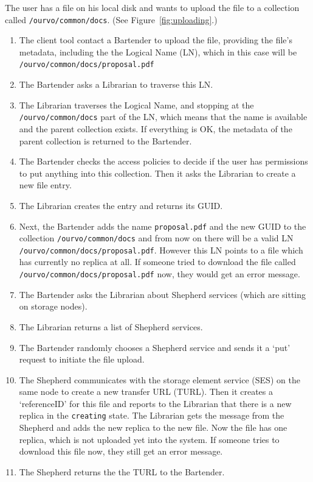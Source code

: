 \documentclass{book}
\begin{document}
The user has a file on his local disk and wants to upload the file to a collection called \verb#/ourvo/common/docs#. (See Figure~\ref{fig:uploading}.)
\begin{enumerate}
    \item The client tool contact a Bartender to upload the file, providing the file's metadata, including the the Logical Name (LN), which in this case will be \verb#/ourvo/common/docs/proposal.pdf#
    \item The Bartender asks a Librarian to traverse this LN.
    \item The Librarian traverses the Logical Name, and stopping at the \verb#/ourvo/common/docs# part of the LN, which means that the name is available and the parent collection exists. If everything is OK, the metadata of the parent collection is returned to the Bartender. 
    \item The Bartender checks the access policies to decide if the user has permissions to put anything into this collection. Then it asks the Librarian to create a new file entry. 
    \item The Librarian creates the entry and returns its GUID.
    \item Next, the Bartender adds the name \verb#proposal.pdf# and the new GUID to the collection \verb#/ourvo/common/docs# and from now on there will be a valid LN \verb#/ourvo/common/docs/proposal.pdf#. However this LN points to a file which has currently no replica at all. If someone tried to download the file called \verb#/ourvo/common/docs/proposal.pdf# now, they would get an error message.
    \item The Bartender asks the Librarian about Shepherd services (which are sitting on storage nodes).
    \item The Librarian returns a list of Shepherd services.
    \item The Bartender randomly chooses a Shepherd service and sends it a `put' request to initiate the file upload. 
    \item The Shepherd communicates with the storage element service (SES) on the same node to create a new transfer URL (TURL). Then it creates a `referenceID' for this file and reports to the Librarian that there is a new replica in the \verb#creating# state. The Librarian gets the message from the Shepherd and adds the new replica to the new file. Now the file has one replica, which is not uploaded yet into the system. If someone tries to download this file now, they still get an error message.
    \item The Shepherd returns the the TURL to the Bartender.

\end{enumerate}
\end{document}
